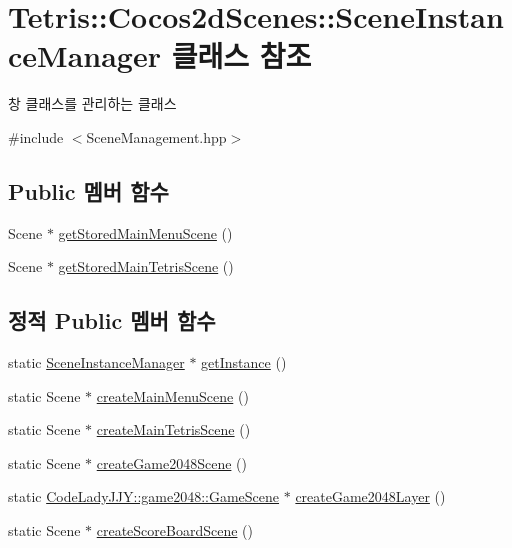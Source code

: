 \hypertarget{class_tetris_1_1_cocos2d_scenes_1_1_scene_instance_manager}{}\section{Tetris\+:\+:Cocos2d\+Scenes\+:\+:Scene\+Instance\+Manager 클래스 참조}
\label{class_tetris_1_1_cocos2d_scenes_1_1_scene_instance_manager}


창 클래스를 관리하는 클래스  




{\ttfamily \#include $<$Scene\+Management.\+hpp$>$}

\subsection*{Public 멤버 함수}
\begin{DoxyCompactItemize}
\item 
Scene $\ast$ \hyperlink{class_tetris_1_1_cocos2d_scenes_1_1_scene_instance_manager_ac7f573b16a4fd8746fd1f397dbfd01c2}{get\+Stored\+Main\+Menu\+Scene} ()
\item 
Scene $\ast$ \hyperlink{class_tetris_1_1_cocos2d_scenes_1_1_scene_instance_manager_af79d0ad920411ed2b87545b49bc32e6c}{get\+Stored\+Main\+Tetris\+Scene} ()
\end{DoxyCompactItemize}
\subsection*{정적 Public 멤버 함수}
\begin{DoxyCompactItemize}
\item 
static \hyperlink{class_tetris_1_1_cocos2d_scenes_1_1_scene_instance_manager}{Scene\+Instance\+Manager} $\ast$ \hyperlink{class_tetris_1_1_cocos2d_scenes_1_1_scene_instance_manager_a0010e1efc6470cde661494631dc35b90}{get\+Instance} ()
\item 
static Scene $\ast$ \hyperlink{class_tetris_1_1_cocos2d_scenes_1_1_scene_instance_manager_a7dad1373db969d5c882e2cdc46f7933a}{create\+Main\+Menu\+Scene} ()
\item 
static Scene $\ast$ \hyperlink{class_tetris_1_1_cocos2d_scenes_1_1_scene_instance_manager_a536188c1cdb7cb46ebd2edc8ebf1f17a}{create\+Main\+Tetris\+Scene} ()
\item 
static Scene $\ast$ \hyperlink{class_tetris_1_1_cocos2d_scenes_1_1_scene_instance_manager_a271e373f7a835b2e8dcec0a69be4f849}{create\+Game2048\+Scene} ()
\item 
static \hyperlink{class_code_lady_j_j_y_1_1game2048_1_1_game_scene}{Code\+Lady\+J\+J\+Y\+::game2048\+::\+Game\+Scene} $\ast$ \hyperlink{class_tetris_1_1_cocos2d_scenes_1_1_scene_instance_manager_abf51bf93d8d00d660c18b9e690fdee1a}{create\+Game2048\+Layer} ()
\item 
static Scene $\ast$ \hyperlink{class_tetris_1_1_cocos2d_scenes_1_1_scene_instance_manager_a159ac191291a7cc3575d6f5790df6646}{create\+Score\+Board\+Scene} ()
\end{DoxyCompactItemize}
